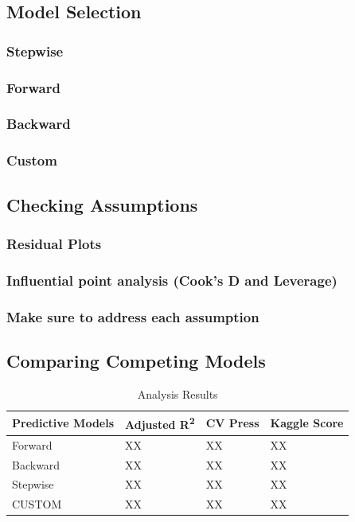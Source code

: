 \documentclass[11pt]{scrartcl} %
\begin{document}
\subsection{Model Selection}
\subsubsection{Stepwise}
\subsubsection{Forward}
\subsubsection{Backward}
\subsubsection{Custom}

\subsection{Checking Assumptions}
\subsubsection{Residual Plots}
\subsubsection{Influential point analysis (Cook’s D and Leverage)}
\subsubsection{Make sure to address each assumption}

\subsection{Comparing Competing Models}
\begin{table}[h] %
	\centering %
\begin{tabular}{|l|l|l|l|}
\hline
\textbf{Predictive Models} & \textbf{Adjusted R\textsuperscript{2}} & \textbf{CV Press} & \textbf{Kaggle Score}\\
\hline
Forward & XX & XX & XX\\
\hline
Backward & XX & XX & XX\\
\hline
Stepwise & XX & XX & XX\\
\hline
CUSTOM & XX & XX & XX\\
\hline
\end{tabular}
\caption{Analysis Results}
\end{table}
\end{document}
